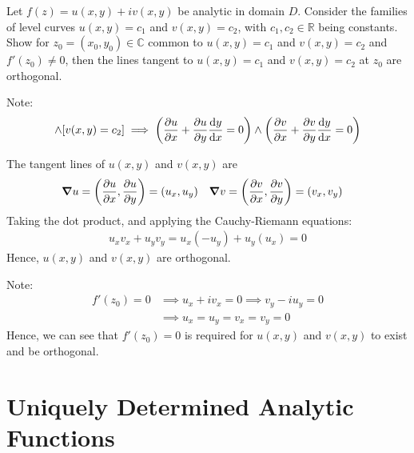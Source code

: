 \documentclass[12pt, english]{book}
\makeatletter
\renewenvironment{proof}[1][\proofname]{\par
	\pushQED{\qed}%
	\normalfont \topsep6\p@\@plus6\p@\relax
	\list{}{%
		\settowidth{\leftmargin}{\itshape\proofname:\hskip\labelsep}%
		\setlength{\labelwidth}{0pt}%
		\setlength{\itemindent}{-\leftmargin}%
	}%
	\item[\hskip\labelsep\itshape#1\@addpunct{:}]\ignorespaces
	}{ \popQED\endlist\@endpefalse}
\makeatother
\begin{document}
	\begin{example}
		\label{f' neq 0 implies level curve are orthogonal Example - Complex}
		Let \(f(z) = u(x,y) + iv(x,y)\) be analytic in domain \(D\). Consider the families of level curves \(u(x,y) = c_1\) and \(v(x,y) = c_2\), with \(c_1, c_2 \in \mathbb{R}\) being constants. Show for \(z_0 = (x_0, y_0) \in \mathbb{C}\) common to \(u(x,y) = c_1\) and \(v(x,y) = c_2\) and \(f'(z_0) \neq 0\), then the lines tangent to \(u(x,y) = c_1\) and \(v(x,y) = c_2\) at \(z_0\) are orthogonal. 
		
		Note: 
		\begin{align*}
			[u(x,y) = c_1] \land [v(x,y) = c_2] \implies 
			\left(\pdv{u}{x} + \pdv{u}{y} \dv{y}{x} = 0\right) \land 
			\left(\pdv{v}{x} + \pdv{v}{y} \dv{y}{x} = 0\right)
		\end{align*}
	
		\begin{proof}{\color{Grey}
			The tangent lines of \(u(x,y)\) and \(v(x,y)\) are
			\begin{align*}
				\grad{u} &= \left(\pdv{u}{x}, \pdv{u}{y}\right) = (u_x, u_y)&
				\grad{v} &= \left(\pdv{v}{x}, \pdv{v}{y}\right) = (v_x, v_y)
			\end{align*}
			Taking the dot product, and applying the Cauchy-Riemann equations: 
			\begin{align*}
				u_x v_x + u_y v_y = u_x (-u_y) + u_y (u_x) = 0
			\end{align*}
			Hence, \(u(x,y)\) and \(v(x,y)\) are orthogonal.
			
			Note:
			\begin{align*}
				f'(z_0) = 0 
				&\implies u_x + iv_x = 0 \implies v_y - iu_y = 0 \\
				&\implies u_x = u_y = v_x = v_y = 0
			\end{align*}
			Hence, we can see that \(f'(z_0) = 0\) is required for \(u(x,y)\) and \(v(x,y)\) to exist and be orthogonal.
		}
		\end{proof}
	\end{example}
	
	
	\section{Uniquely Determined Analytic Functions} \label{Uniquely Determined Analytic Functions Section - Complex}
	
\end{document}
